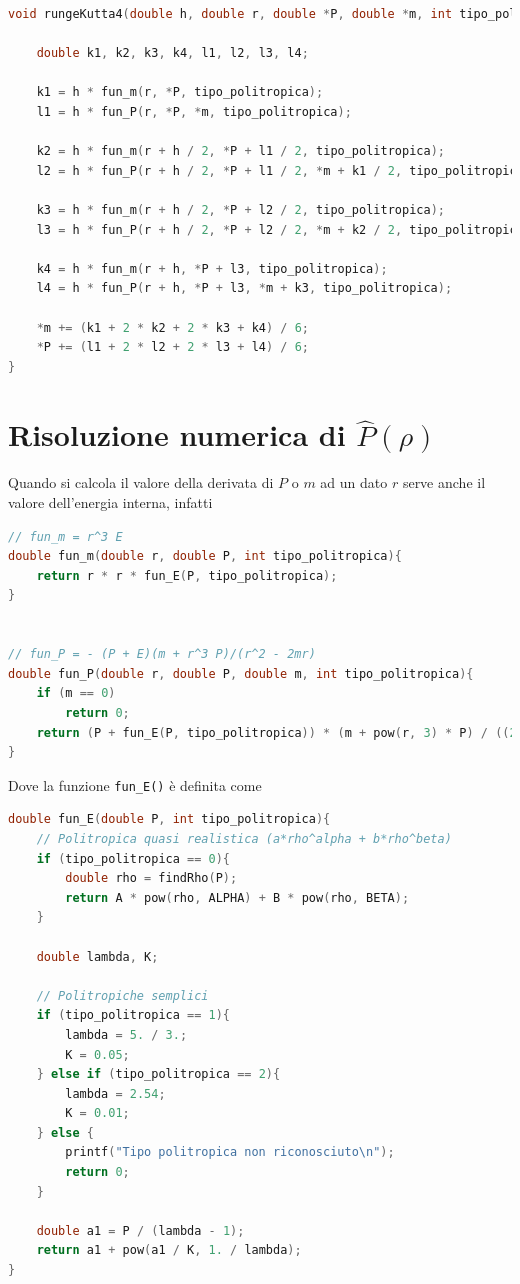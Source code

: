 \documentclass[a4paper, titlepage]{article}
\begin{document}
\begin{lstlisting}[language=C]
void rungeKutta4(double h, double r, double *P, double *m, int tipo_politropica){

    double k1, k2, k3, k4, l1, l2, l3, l4;

    k1 = h * fun_m(r, *P, tipo_politropica);
    l1 = h * fun_P(r, *P, *m, tipo_politropica);

    k2 = h * fun_m(r + h / 2, *P + l1 / 2, tipo_politropica);
    l2 = h * fun_P(r + h / 2, *P + l1 / 2, *m + k1 / 2, tipo_politropica);

    k3 = h * fun_m(r + h / 2, *P + l2 / 2, tipo_politropica);
    l3 = h * fun_P(r + h / 2, *P + l2 / 2, *m + k2 / 2, tipo_politropica);

    k4 = h * fun_m(r + h, *P + l3, tipo_politropica);
    l4 = h * fun_P(r + h, *P + l3, *m + k3, tipo_politropica);

    *m += (k1 + 2 * k2 + 2 * k3 + k4) / 6;
    *P += (l1 + 2 * l2 + 2 * l3 + l4) / 6;
}
\end{lstlisting}

\section{Risoluzione numerica di $\hat P (\rho)$} \label{ap:eps(r)1}

Quando si calcola il valore della derivata di $P$ o $m$ ad un dato $r$ serve anche il valore dell'energia interna, infatti
\begin{lstlisting}[language=C]
// fun_m = r^3 E
double fun_m(double r, double P, int tipo_politropica){
    return r * r * fun_E(P, tipo_politropica);
}


// fun_P = - (P + E)(m + r^3 P)/(r^2 - 2mr)
double fun_P(double r, double P, double m, int tipo_politropica){
    if (m == 0)
        return 0;
    return (P + fun_E(P, tipo_politropica)) * (m + pow(r, 3) * P) / ((2 * m - r) * r);
}
\end{lstlisting}
Dove la funzione \texttt{fun\_E()} è definita come
\begin{lstlisting}[language=C]
double fun_E(double P, int tipo_politropica){
    // Politropica quasi realistica (a*rho^alpha + b*rho^beta)
    if (tipo_politropica == 0){
        double rho = findRho(P);
        return A * pow(rho, ALPHA) + B * pow(rho, BETA);
    }

    double lambda, K;

    // Politropiche semplici
    if (tipo_politropica == 1){
        lambda = 5. / 3.;
        K = 0.05;
    } else if (tipo_politropica == 2){
        lambda = 2.54;
        K = 0.01;
    } else {
        printf("Tipo politropica non riconosciuto\n");
        return 0;
    }

    double a1 = P / (lambda - 1);
    return a1 + pow(a1 / K, 1. / lambda);
}
\end{lstlisting}
\end{document}
